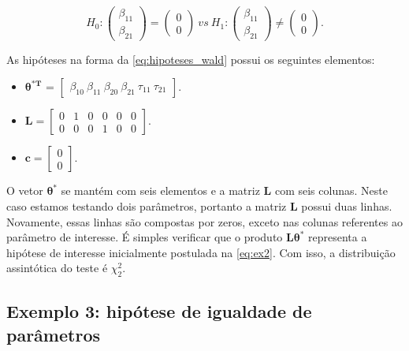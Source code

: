 $$
H_0: 
\begin{pmatrix}
\beta_{11} \\ 
\beta_{21}
\end{pmatrix} 
= 
\begin{pmatrix}
0 \\ 
0
\end{pmatrix}
\ vs \ 
H_1: 
\begin{pmatrix}
\beta_{11} \\ 
\beta_{21}
\end{pmatrix} 
\neq
\begin{pmatrix}
0 \\ 
0 
\end{pmatrix}.
$$

As hipóteses na forma da \autoref{eq:hipoteses_wald} possui os seguintes elementos:

\begin{itemize}
  
  \item $\boldsymbol{\theta^{*T}}$ = $\begin{bmatrix} \beta_{10} \  \beta_{11} \ \beta_{20} \ \beta_{21} \ \tau_{11} \ \tau_{21} \end{bmatrix}$.


\item $\boldsymbol{L} = \begin{bmatrix} 0 & 1 & 0 & 0 & 0 & 0 \\
0 & 0 & 0 & 1 & 0 & 0 \end{bmatrix}.$
 
\item $\boldsymbol{c} = \begin{bmatrix} 0 \\ 0 \end{bmatrix}.$

\end{itemize}

O vetor $\boldsymbol{\theta^{*}}$ se mantém com seis elementos e a matriz $\boldsymbol{L}$ com seis colunas. Neste caso estamos testando dois parâmetros, portanto a matriz $\boldsymbol{L}$ possui duas linhas. Novamente, essas linhas são compostas por zeros, exceto nas colunas referentes ao parâmetro de interesse. É simples verificar que o produto $\boldsymbol{L}\boldsymbol{\theta^{*}}$ representa a hipótese de interesse inicialmente postulada na \autoref{eq:ex2}. Com isso, a distribuição assintótica do teste é $\chi^2_2$.

\subsection{Exemplo 3: hipótese de igualdade de parâmetros}

